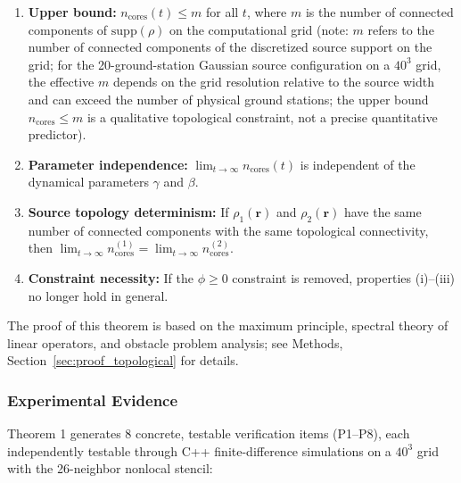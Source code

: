 \documentclass[sn-nature,pdflatex]{sn-jnl}
\begin{document}
\begin{enumerate}
  \item[(i)] \textbf{Upper bound:} $n_{\text{cores}}(t) \le m$ for all $t$, where $m$ is the number of connected components of $\text{supp}(\rho)$ on the computational grid (note: $m$ refers to the number of connected components of the discretized source support on the grid; for the 20-ground-station Gaussian source configuration on a $40^3$ grid, the effective $m$ depends on the grid resolution relative to the source width and can exceed the number of physical ground stations; the upper bound $n_{\text{cores}} \le m$ is a qualitative topological constraint, not a precise quantitative predictor).
  \item[(ii)] \textbf{Parameter independence:} $\lim_{t \to \infty} n_{\text{cores}}(t)$ is independent of the dynamical parameters $\gamma$ and $\beta$.
  \item[(iii)] \textbf{Source topology determinism:} If $\rho_1(\mathbf{r})$ and $\rho_2(\mathbf{r})$ have the same number of connected components with the same topological connectivity, then $\lim_{t \to \infty} n_{\text{cores}}^{(1)} = \lim_{t \to \infty} n_{\text{cores}}^{(2)}$.
  \item[(iv)] \textbf{Constraint necessity:} If the $\phi \ge 0$ constraint is removed, properties (i)--(iii) no longer hold in general.
\end{enumerate}

The proof of this theorem is based on the maximum principle, spectral theory of linear operators, and obstacle problem analysis; see Methods, Section~\ref{sec:proof_topological} for details.

\subsubsection{Experimental Evidence}

Theorem 1 generates 8 concrete, testable verification items (P1--P8), each independently testable through C++ finite-difference simulations on a $40^3$ grid with the 26-neighbor nonlocal stencil:
\end{document}
